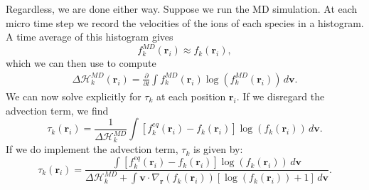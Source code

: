 \documentclass{article}
\begin{document}
Regardless, we are done either way. Suppose we run the MD simulation. At each micro time step we record the velocities of the ions of each species in a histogram. A time average of this histogram gives
\begin{equation}
f_k^{MD}(\mathbf{r}_i)\approx f_k(\mathbf{r}_i),
\end{equation}which we can then use to compute
\begin{align}
\Delta \mathcal{H}^{MD}_k(\mathbf{r}_i)=\frac{\partial}{\partial t}\int f_k^{MD}(\mathbf{r}_i)\log(f_k^{MD}(\mathbf{r}_i))\,d\mathbf{v}\label{H1}.
\end{align}We can now solve explicitly for $\tau_k$ at each position $\mathbf{r}_i$. If we disregard the advection term, we find
\begin{equation}
\tau_k(\mathbf{r}_i)=\frac{1}{\Delta\mathcal{H}_k^{MD}}\int [f_k^{eq}(\mathbf{r}_i)-f_k(\mathbf{r}_i)]\log(f_k(\mathbf{r}_i))\,d\mathbf{v}.
\end{equation}If we do implement the advection term, $\tau_k$ is given by:
\begin{equation}
\tau_k(\mathbf{r}_i)=\frac{\int [f_k^{eq}(\mathbf{r}_i)-f_k(\mathbf{r}_i)]\log(f_k(\mathbf{r}_i))\,d\mathbf{v}}{\Delta\mathcal{H}_k^{MD}+\int \mathbf{v}\cdot\nabla_\mathbf{r}(f_k(\mathbf{r}_i))[\log(f_k(\mathbf{r}_i))+1]\,d\mathbf{v}}.
\end{equation}
\end{document}
